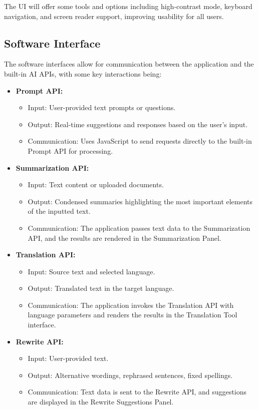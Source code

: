 \documentclass{article}
\begin{document}
The UI will offer some tools and options including high-contrast mode, keyboard navigation, and screen reader support, improving usability for all users.

\subsection{Software Interface}
The software interfaces allow for communication between the application and the built-in AI APIs, with some key interactions being:

\begin{itemize}
    \item \textbf{Prompt API:} 
    \begin{itemize}
        \item Input: User-provided text prompts or questions.
        \item Output: Real-time suggestions and responses based on the user's input.
        \item Communication: Uses JavaScript to send requests directly to the built-in Prompt API for processing.
    \end{itemize}
    
    \item \textbf{Summarization API:}
    \begin{itemize}
        \item Input: Text content or uploaded documents.
        \item Output: Condensed summaries highlighting the most important elements of the inputted text.
        \item Communication: The application passes text data to the Summarization API, and the results are rendered in the Summarization Panel.
    \end{itemize}
    
    \item \textbf{Translation API:}
    \begin{itemize}
        \item Input: Source text and selected language.
        \item Output: Translated text in the target language.
        \item Communication: The application invokes the Translation API with language parameters and renders the results in the Translation Tool interface.
    \end{itemize}

\item \textbf{Rewrite API:}
    \begin{itemize}
        \item Input: User-provided text.
        \item Output: Alternative wordings, rephrased sentences, fixed spellings.
        \item Communication: Text data is sent to the Rewrite API, and suggestions are displayed in the Rewrite Suggestions Panel.
    \end{itemize}
\end{itemize}
\end{document}
